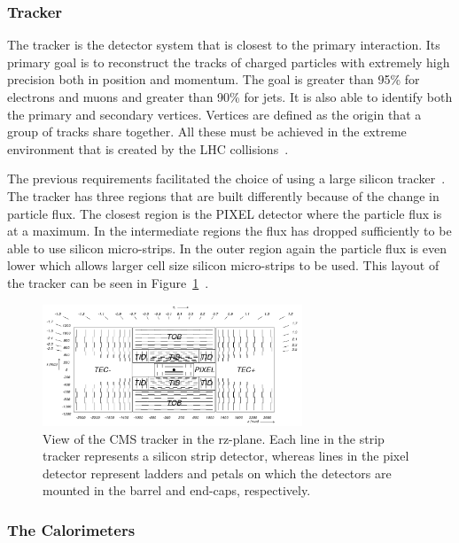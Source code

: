 \subsubsection{Tracker}
The tracker is the detector system that is closest to the primary interaction.  Its primary goal is to reconstruct the tracks of charged particles with extremely high precision both in position and momentum. The goal is greater than 95\% for electrons and muons and greater than 90\% for jets. It is also able to identify both the primary and secondary vertices.  Vertices are defined as the origin that a group of tracks share together. All these must be achieved in the extreme environment that is created by the LHC collisions~\cite{cms_trakcer_project}.

The previous requirements facilitated the choice of using a large silicon tracker~\cite{cms_trakcer_project}.  The tracker has three regions that are built differently because of the change in particle flux.  The closest region is the PIXEL detector where the particle flux is at a maximum.
In the intermediate regions the flux has dropped sufficiently to be able to use silicon micro-strips.  In the outer region again the particle flux is even lower which allows larger cell size silicon micro-strips to be used.  This layout of the tracker can be seen in Figure~\ref{fig:CMS_tacker}~\cite{2010JInst...5.6007S}.

\begin{figure}[htb]
\centering
\includegraphics[width=0.69\textwidth]{Experiment/fig_cmstracker.png}
\caption{View of the CMS tracker in the rz-plane. Each line in the strip tracker represents a silicon strip detector, whereas lines in the pixel detector represent ladders and petals on which the detectors are mounted in the barrel and end-caps, respectively.~\cite{2010JInst...5.6007S}}
\label{fig:CMS_tacker}
\end{figure}

\subsubsection{The Calorimeters}

